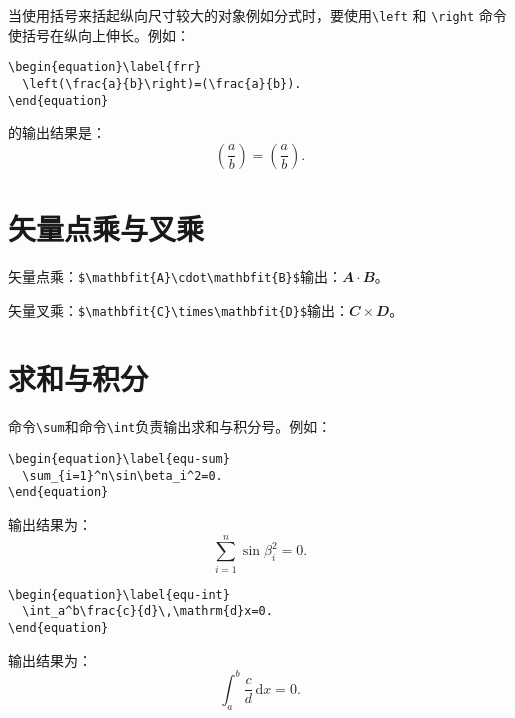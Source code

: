 当使用括号来括起纵向尺寸较大的对象例如分式时，要使用\verb|\left| 和
\verb|\right| 命令使括号在纵向上伸长。例如：
\begin{verbatim}
\begin{equation}\label{frr}
  \left(\frac{a}{b}\right)=(\frac{a}{b}).
\end{equation}
\end{verbatim}
的输出结果是：
\begin{equation}\label{frr}
\left(\frac{a}{b}\right)=(\frac{a}{b}).
\end{equation}

\section{矢量点乘与叉乘}\label{section4-3}
矢量点乘：\verb|$\mathbfit{A}\cdot\mathbfit{B}$|输出：$\mathbfit{A}\cdot\mathbfit{B}$。

矢量叉乘：\verb|$\mathbfit{C}\times\mathbfit{D}$|输出：$\mathbfit{C}\times\mathbfit{D}$。

\section{求和与积分}\label{section4-4}
命令\verb|\sum|和命令\verb|\int|负责输出求和与积分号。例如：
\begin{verbatim}
\begin{equation}\label{equ-sum}
  \sum_{i=1}^n\sin\beta_i^2=0.
\end{equation}
\end{verbatim}
输出结果为：
\begin{equation}\label{equ-sum}
\sum_{i=1}^n\sin\beta_i^2=0.
\end{equation}
\begin{verbatim}
\begin{equation}\label{equ-int}
  \int_a^b\frac{c}{d}\,\mathrm{d}x=0.
\end{equation}
\end{verbatim}
输出结果为：
\begin{equation}\label{equ-int}
  \int_a^b\frac{c}{d}\,\mathrm{d}x=0.
\end{equation}


